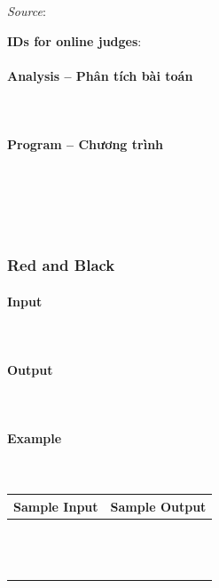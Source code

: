 \documentclass{article}
\begin{document}
\textit{Source}: 

\textbf{IDs for online judges}:

\paragraph{Analysis -- Phân tích bài toán} \mbox{} \\



\paragraph{Program -- Chương trình} \mbox{} \\


\begin{lstlisting}
	
	
\end{lstlisting}

\subsubsection{Red and Black}
 

\paragraph{Input} \mbox{} \\



\paragraph{Output}\mbox{} \\


\paragraph{Example}\mbox{} \\

\begin{table}[h]
    \centering
    \begin{tabular}{|l|r|}
        \hline
        \textbf{Sample Input} & \textbf{Sample Output} \\
        \hline
		&  \\ 
		&  \\ 
		&  \\ 
		&  \\ 
		&  \\
		&  \\ 
		&  \\ 
		&  \\ 
		&  \\ 
		&  \\ 
		&  \\ 
		&  \\
		&  \\ \hline
    \end{tabular}
\end{table}
\end{document}
